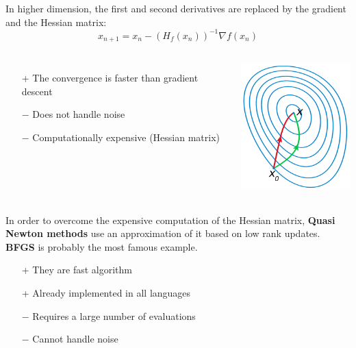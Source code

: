 \documentclass{beamer}
\begin{document}
\begin{frame}{}
In higher dimension, the first and second derivatives are replaced by the gradient and the Hessian matrix:
$$ x_{n+1} = x_n - (H_f(x_n))^{-1} \nabla f(x_n) $$
\begin{columns}[c]
\column{5cm}
\begin{itemize}
	\item[+] The convergence is faster than gradient descent
	\item[$-$] Does not handle noise
	\item[$-$] Computationally expensive (Hessian matrix)
\end{itemize}
\column{5cm}
\begin{center}
\includegraphics[height=5cm]{figures/newton}
\end{center}
\end{columns}
\end{frame}

\begin{frame}{}
In order to overcome the expensive computation of the Hessian matrix, \textbf{Quasi Newton methods} use an approximation of it based on low rank updates.\\
\vspace{5mm}
\textbf{BFGS} is probably the most famous example.
\begin{itemize}
	\item[+] They are fast algorithm
	\item[+] Already implemented in all languages
	\item[$-$] Requires a large number of evaluations
	\item[$-$] Cannot handle noise
\end{itemize}
\end{frame}
\end{document}
